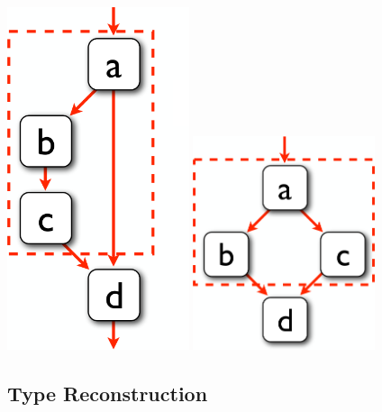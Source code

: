 \documentclass[a4paper, 11pt]{article}
\begin{document}
{\begin{minipage}[t]{0.47\textwidth}
    \includegraphics[width=0.4\textwidth]{if.png}
    \includegraphics[width=0.4\textwidth]{ifelse.png}
    \end{minipage}

    \subsection*{Type Reconstruction}
    {
        
    }
}
\end{document}
